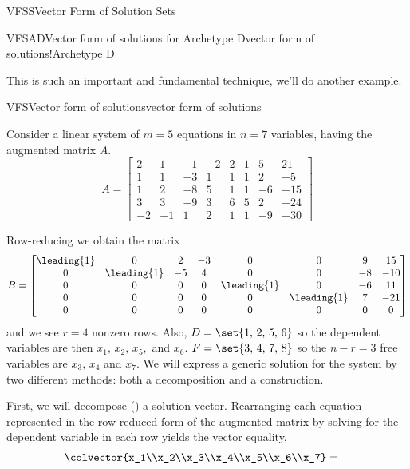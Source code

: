 \begin{subsect}{VFSS}{Vector Form of Solution Sets}
\begin{example}{VFSAD}{Vector form of solutions for Archetype D}{vector form of solutions!Archetype D}
\end{example}
%
\begin{para}This is such an important and fundamental technique, we'll do another example.\end{para}
%
\begin{example}{VFS}{Vector form of solutions}{vector form of solutions}
\begin{para}Consider a linear system of $m=5$ equations in $n=7$ variables, having the augmented matrix $A$.
%
\begin{equation*}
A=
\begin{bmatrix}
 2 & 1 & -1 & -2 & 2 & 1 & 5 & 21 \\
 1 & 1 & -3 & 1 & 1 & 1 & 2 & -5 \\
 1 & 2 & -8 & 5 & 1 & 1 & -6 & -15 \\
 3 & 3 & -9 & 3 & 6 & 5 & 2 & -24 \\
 -2 & -1 & 1 & 2 & 1 & 1 & -9 & -30
\end{bmatrix}
\end{equation*}\end{para}
%
\begin{para}Row-reducing we obtain the matrix
%
\begin{equation*}
B=
\begin{bmatrix}
 \leading{1} & 0 & 2 & -3 & 0 & 0 & 9 &  15 \\
 0 & \leading{1} & -5 & 4 & 0 & 0 & -8 &  -10 \\
 0 & 0 & 0 & 0 & \leading{1} & 0 & -6 &  11 \\
 0 & 0 & 0 & 0 & 0 & \leading{1} & 7 &  -21 \\
 0 & 0 & 0 & 0 & 0 & 0 & 0 & 0
\end{bmatrix}
\end{equation*}
%
and we see $r=4$ nonzero rows. Also, $D=\set{1,\,2,\,5,\,6}$ so the dependent variables are then $x_1,\,x_2,\,x_5,$ and $x_6$.  $F=\set{3,\,4,\,7,\,8}$ so the $n-r=3$ free variables are $x_3,\,x_4$ and $x_7$.  We will express a generic solution for the system by two different methods: both a decomposition and a construction.\end{para}
%
\begin{para}First, we will decompose () a solution vector.  Rearranging each equation represented in the row-reduced form of the augmented matrix by solving for the dependent variable in each row yields the vector equality,
%
\begin{align*}
\colvector{x_1\\x_2\\x_3\\x_4\\x_5\\x_6\\x_7}&=

\end{align*}
\end{para}
\end{example}
\end{subsect}
